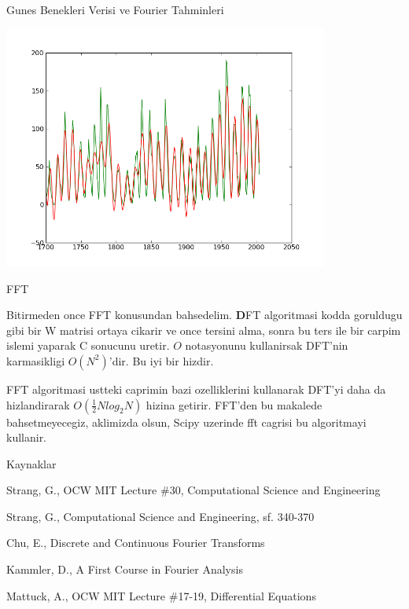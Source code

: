 \documentclass[12pt,fleqn]{article}
\begin{document}
Gunes Benekleri Verisi ve Fourier Tahminleri

\includegraphics[height=8cm]{sunspots-fourier.png}

FFT

Bitirmeden once FFT konusundan bahsedelim. \textbf{D}FT algoritmasi kodda
goruldugu gibi bir W matrisi ortaya cikarir ve once tersini alma, sonra bu ters
ile bir carpim islemi yaparak C sonucunu uretir. $O$ notasyonunu kullanirsak
DFT'nin karmasikligi $O(N^2)$'dir. Bu iyi bir hizdir. 

FFT algoritmasi ustteki caprimin bazi ozelliklerini kullanarak DFT'yi daha da
hizlandirarak $O(\frac{1}{2}Nlog_2N)$ hizina getirir. FFT'den bu makalede
bahsetmeyecegiz, aklimizda olsun, Scipy uzerinde fft cagrisi bu algoritmayi
kullanir.

Kaynaklar

Strang, G., OCW MIT Lecture \#30, Computational Science and Engineering

Strang, G., Computational Science and Engineering, sf. 340-370

Chu, E., Discrete and Continuous Fourier Transforms

Kammler, D., A First Course in Fourier Analysis

Mattuck, A., OCW MIT Lecture \#17-19, Differential Equations
\end{document}
